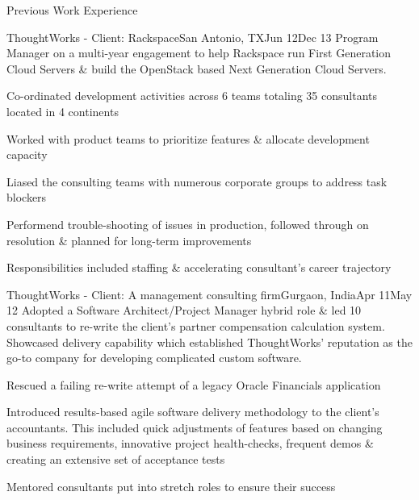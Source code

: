 \documentclass{resume} %
\begin{document}

\begin{rSection}{Previous Work Experience}
\begin{rSubsection}{ThoughtWorks - Client: Rackspace}{San Antonio, TX}{Jun
    12}{Dec 13}
{Program Manager on a multi-year engagement to help Rackspace run
  First Generation Cloud Servers \& build the OpenStack based Next
  Generation Cloud Servers.}

\item Co-ordinated development activities across 6 teams
  totaling 35 consultants located in 4 continents
\item Worked with product teams to prioritize features \& allocate development capacity
\item Liased the consulting teams with numerous corporate groups to address task blockers
\item Performend trouble-shooting of issues in production, followed
  through on resolution \& planned for long-term improvements
\item Responsibilities included staffing \& accelerating consultant's career trajectory
\end{rSubsection}


\begin{rSubsection}{ThoughtWorks - Client: A management consulting
    firm}{Gurgaon, India}{Apr 11}{May 12}
{Adopted a Software Architect/Project Manager hybrid role \& led 10 consultants to re-write the
  client's partner compensation calculation system. Showcased delivery
  capability which established ThoughtWorks' reputation as the go-to company for developing complicated custom software.}

\item Rescued a failing re-write attempt of a legacy Oracle Financials
  application
\item Introduced results-based agile software delivery
  methodology to the client's accountants. This included quick
  adjustments of features based on changing business requirements, innovative
  project health-checks, frequent demos \& creating an extensive set
  of acceptance tests
\item Mentored consultants put into stretch roles to ensure their
  success
\end{rSubsection}


\end{rSection}
\end{document}
